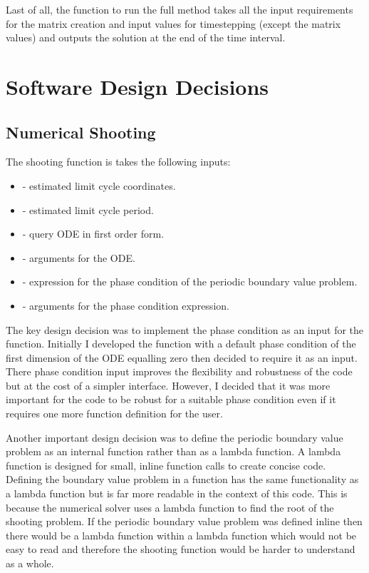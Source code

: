 \documentclass[10pt]{article}
\begin{document}
\begin{multicols}{2}
Last of all, the function to run the full method  takes all the input requirements for the matrix creation and input values for timestepping (except the matrix values) and outputs the solution at the end of the time interval.

\section{Software Design Decisions}
\subsection{Numerical Shooting}

The shooting function is takes the following inputs:
\begin{itemize}
    \item {} - estimated limit cycle coordinates.
    \item {} - estimated limit cycle period.
    \item {} - query ODE in first order form.
    \item {} - arguments for the ODE.
    \item {} - expression for the phase condition of the periodic boundary value problem. 
    \item {} - arguments for the phase condition expression.
\end{itemize}

The key design decision was to implement the phase condition as an input for the function. Initially I developed the function with a default phase condition of the first dimension of the ODE equalling zero then decided to require it as an input. There phase condition input improves the flexibility and robustness of the code but at the cost of a simpler interface. However, I decided that it was more important for the code to be robust for a suitable phase condition even if it requires one more function definition for the user.

Another important design decision was to define the periodic boundary value problem as an internal function rather than as a lambda function. A lambda function is designed for small, inline function calls to create concise code. Defining the boundary value problem in a function has the same functionality as a lambda function but is far more readable in the context of this code. This is because the numerical solver uses a lambda function to find the root of the shooting problem. If the periodic boundary value problem was defined inline then there would be a lambda function within a lambda function which would not be easy to read and therefore the shooting function would be harder to understand as a whole.



\end{multicols}
\end{document}
